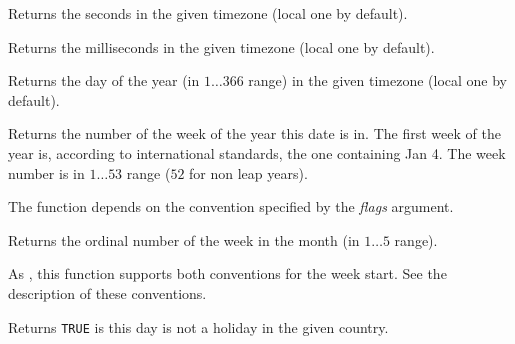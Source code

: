 \label{wxdatetimegetsecond}


Returns the seconds in the given timezone (local one by default).

\label{wxdatetimegetmillisecond}


Returns the milliseconds in the given timezone (local one by default).

\label{wxdatetimegetdayofyear}


Returns the day of the year (in $1\ldots366$ range) in the given timezone
(local one by default).

\label{wxdatetimegetweekofyear}


Returns the number of the week of the year this date is in. The first week of
the year is, according to international standards, the one containing Jan 4.
The week number is in $1\ldots53$ range ($52$ for non leap years).

The function depends on the  convention
specified by the {\it flags} argument.

\label{wxdatetimegetweekofmonth}


Returns the ordinal number of the week in the month (in $1\ldots5$  range).

As , this function supports
both conventions for the week start. See the description of these
 conventions.

\label{wxdatetimeisworkday}


Returns {\tt TRUE} is this day is not a holiday in the given country.

